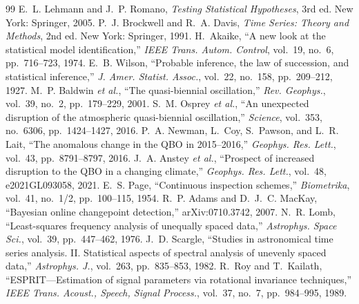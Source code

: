 \documentclass[10pt,twocolumn,letterpaper]{article}
\theoremstyle{definition}
\theoremstyle{remark}
\begin{document}
\begin{thebibliography}{99}
 E.~L. Lehmann and J.~P. Romano, \emph{Testing Statistical Hypotheses}, 3rd ed. New York: Springer, 2005.
 P.~J. Brockwell and R.~A. Davis, \emph{Time Series: Theory and Methods}, 2nd ed. New York: Springer, 1991.
 H.~Akaike, ``A new look at the statistical model identification,'' \emph{IEEE Trans. Autom. Control}, vol.~19, no.~6, pp.~716--723, 1974.
 E.~B. Wilson, ``Probable inference, the law of succession, and statistical inference,'' \emph{J. Amer. Statist. Assoc.}, vol.~22, no.~158, pp.~209--212, 1927.
 M.~P. Baldwin \emph{et al.}, ``The quasi-biennial oscillation,'' \emph{Rev. Geophys.}, vol.~39, no.~2, pp.~179--229, 2001.
 S.~M. Osprey \emph{et al.}, ``An unexpected disruption of the atmospheric quasi-biennial oscillation,'' \emph{Science}, vol.~353, no.~6306, pp.~1424--1427, 2016.
 P.~A. Newman, L.~Coy, S.~Pawson, and L.~R. Lait, ``The anomalous change in the QBO in 2015--2016,'' \emph{Geophys. Res. Lett.}, vol.~43, pp.~8791--8797, 2016.
 J.~A. Anstey \emph{et al.}, ``Prospect of increased disruption to the QBO in a changing climate,'' \emph{Geophys. Res. Lett.}, vol.~48, e2021GL093058, 2021.
 E.~S. Page, ``Continuous inspection schemes,'' \emph{Biometrika}, vol.~41, no.~1/2, pp.~100--115, 1954.
 R.~P. Adams and D.~J.~C. MacKay, ``Bayesian online changepoint detection,'' arXiv:0710.3742, 2007.
 N.~R. Lomb, ``Least-squares frequency analysis of unequally spaced data,'' \emph{Astrophys. Space Sci.}, vol.~39, pp.~447--462, 1976.
 J.~D. Scargle, ``Studies in astronomical time series analysis. II. Statistical aspects of spectral analysis of unevenly spaced data,'' \emph{Astrophys. J.}, vol.~263, pp.~835--853, 1982.
 R.~Roy and T.~Kailath, ``ESPRIT---Estimation of signal parameters via rotational invariance techniques,'' \emph{IEEE Trans. Acoust., Speech, Signal Process.}, vol.~37, no.~7, pp.~984--995, 1989.
\end{thebibliography}
\end{document}
